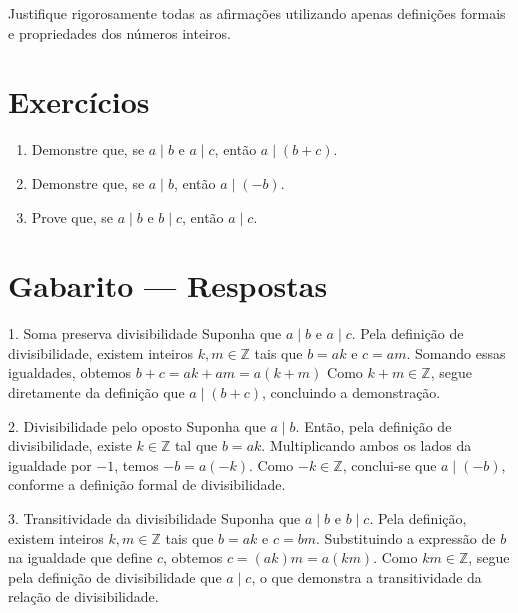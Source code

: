 \documentclass[12pt,a4paper,openright]{book}
\begin{document}
Justifique rigorosamente todas as afirmações utilizando apenas definições formais
e propriedades dos números inteiros.

\section*{Exercícios}

\begin{enumerate}

\item Demonstre que, se $a \mid b$ e $a \mid c$, então $a \mid (b+c)$.

\item Demonstre que, se $a \mid b$, então $a \mid (-b)$.

\item Prove que, se $a \mid b$ e $b \mid c$, então $a \mid c$.



\end{enumerate}

\newpage


\section*{Gabarito — Respostas}
\begin{block}{1. Soma preserva divisibilidade}
Suponha que $a \mid b$ e $a \mid c$. Pela definição de divisibilidade, existem
inteiros $k,m \in \mathbb{Z}$ tais que $b = ak$ e $c = am$. Somando essas
igualdades, obtemos $b + c = ak + am = a(k+m)$
Como $k+m \in \mathbb{Z}$, segue diretamente da definição que
$a \mid (b+c)$, concluindo a demonstração.
\end{block}

\begin{block}{2. Divisibilidade pelo oposto}
Suponha que $a \mid b$. Então, pela definição de divisibilidade, existe
$k \in \mathbb{Z}$ tal que $b = ak$. Multiplicando ambos os lados da igualdade
por $-1$, temos
$-b = a(-k).$
Como $-k \in \mathbb{Z}$, conclui-se que $a \mid (-b)$, conforme a definição
formal de divisibilidade.
\end{block}

\begin{block}{3. Transitividade da divisibilidade}
Suponha que $a \mid b$ e $b \mid c$. Pela definição, existem inteiros
$k,m \in \mathbb{Z}$ tais que $b = ak$ e $c = bm$. Substituindo a expressão
de $b$ na igualdade que define $c$, obtemos
$
c = (ak)m = a(km).
$
Como $km \in \mathbb{Z}$, segue pela definição de divisibilidade que
$a \mid c$, o que demonstra a transitividade da relação de divisibilidade.
\end{block}
\end{document}
